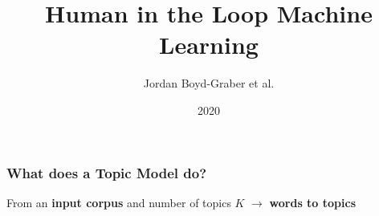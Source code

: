 \documentclass[xcolor=dvipsnames,xcolor=table]{beamer}
\title[HITL ML]{Human in the Loop Machine Learning}
\author{Jordan Boyd-Graber et al.}
\date{2020}
\begin{document}
\frame{
\titlepage
\tiny
}

\begin{frame}

\begin{center}
\frametitle{What does a Topic Model do?}
From an \textbf<1>{input corpus} and number of topics \textbf<1>{$K$} $\rightarrow$ \textbf<2>{words to topics} \\
\end{center}

\end{frame}
\end{document}
